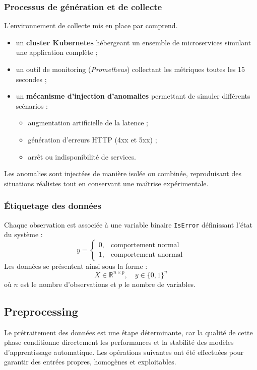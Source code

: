 \documentclass[conference]{IEEEtran}
\begin{document}
\subsubsection{Processus de génération et de collecte}
L’environnement de collecte mis en place par \cite{nobre2023} comprend.
\begin{itemize}
    \item un \textbf{cluster Kubernetes} hébergeant un ensemble de microservices simulant une application complète ;
    \item un outil de monitoring (\textit{Prometheus}) collectant les métriques toutes les 15 secondes ;
    \item un \textbf{mécanisme d’injection d’anomalies} permettant de simuler différents scénarios :
    \begin{itemize}
        \item augmentation artificielle de la latence ;
        \item génération d’erreurs HTTP (4xx et 5xx) ;
        \item arrêt ou indisponibilité de services.
    \end{itemize}
\end{itemize}

Les anomalies sont injectées de manière isolée ou combinée, reproduisant des situations réalistes tout en conservant une maîtrise expérimentale.

\subsubsection{Étiquetage des données}
Chaque observation est associée à une variable binaire \texttt{IsError} définissant l’état du système :
\[
y =
\begin{cases}
0, & \text{comportement normal} \\
1, & \text{comportement anormal}
\end{cases}
\]
Les données se présentent ainsi sous la forme :
\[
X \in \mathbb{R}^{n \times p}, \quad y \in \{0,1\}^n
\]
où $n$ est le nombre d’observations et $p$ le nombre de variables.

\subsection{Preprocessing}

Le prétraitement des données est une étape déterminante, car la qualité de cette phase conditionne directement les performances et la stabilité des modèles d’apprentissage automatique.  
Les opérations suivantes ont été effectuées pour garantir des entrées propres, homogènes et exploitables.
\end{document}

